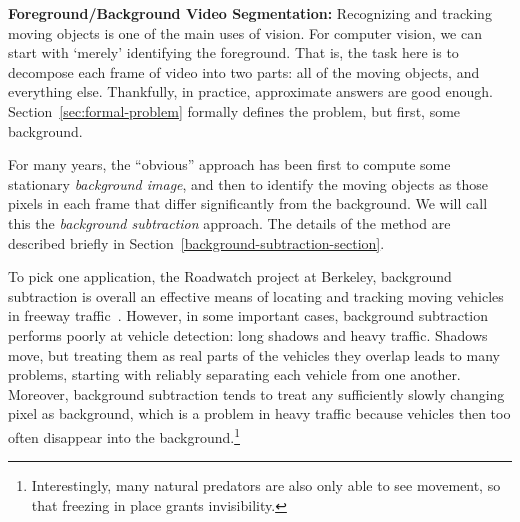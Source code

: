 \newcommand{\secref}[1]{Section~\ref{#1}}
\newcommand{\figref}[1]{Figure~\ref{#1}}
\newcommand{\tabref}[1]{Table~\ref{#1}}
\renewcommand{\eqref}[1]{Equation~(\ref{#1})}

\newcommand{\mbf}[1]{\mbox{{\bf #1}}}
\newcommand{\shortcite}{\cite}
\newcommand{\smbf}[1]{\mbox{{\scriptsize\bf #1}}}
\def\w{\mbf{w}}


{\bf Foreground/Background Video Segmentation:}
Recognizing and tracking moving
objects is one of the main uses of vision.
For computer vision, we can start with `merely' identifying the
foreground.
That is, the task here is to decompose
each frame of video into two parts: all of the moving objects, and
everything else.  Thankfully, in practice, approximate answers are
good enough.  \secref{sec:formal-problem} formally defines the problem,
but first, some background.

For many years, the ``obvious'' approach has
been first to compute some stationary {\em background image}, and then to
identify the moving objects as those pixels in each frame that
differ significantly from the background. We will call this the
{\em background subtraction} approach.
The details of the method are described briefly in
\secref{background-subtraction-section}.

To pick one application, the Roadwatch project at Berkeley,
background subtraction is overall an effective means of
locating and tracking moving vehicles in freeway
traffic~\cite{Koller+al:1994}.
However, in some important cases, background subtraction performs
poorly at vehicle detection: long shadows and heavy traffic.
Shadows move, but treating them as real parts of the vehicles they
overlap leads to many problems, starting with reliably separating each
vehicle from one another.
Moreover, background subtraction tends to treat any
sufficiently slowly changing pixel as
background, which is a problem in heavy traffic because vehicles
then too often disappear into the background.\footnote{Interestingly,
  many natural predators are also only able to see movement, so that
  freezing in place grants invisibility.}

